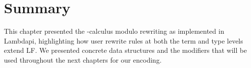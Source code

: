 \section*{Summary}

This chapter presented the \lp{}-calculus modulo rewriting as implemented in Lambdapi, highlighting how user rewrite rules at both the term and type levels extend LF.
We presented concrete data structures and the modifiers that will be used throughout the next chapters for our encoding.
